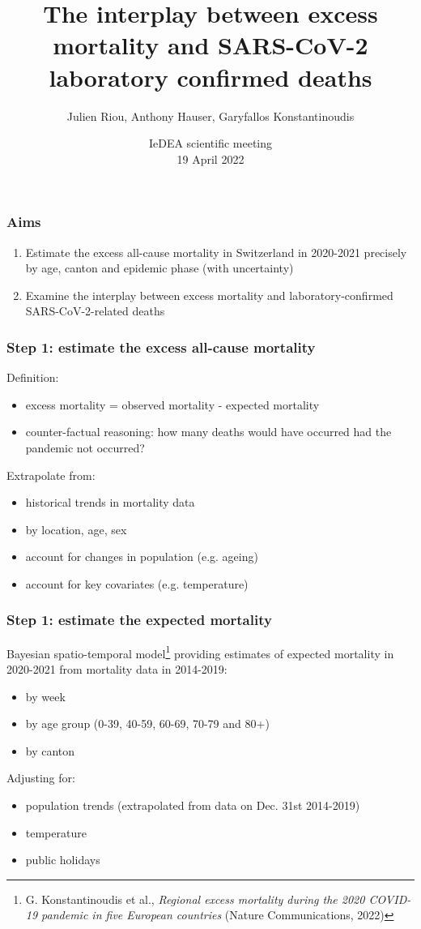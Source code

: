 \documentclass[10pt]{beamer}
\title{The interplay between excess mortality and SARS-CoV-2 laboratory confirmed deaths}
\author{Julien Riou, Anthony Hauser, Garyfallos Konstantinoudis}
\date{ IeDEA scientific meeting \\ 19 April 2022 }
\begin{document}
\frame{\titlepage}

\begin{frame}
\frametitle{Aims}
\begin{enumerate}
	\item Estimate the \alert{excess all-cause mortality} in Switzerland in 2020-2021 precisely by age, canton and epidemic phase (with uncertainty)
	\bigskip
	
	\item Examine the interplay between excess mortality and \alert{laboratory-confirmed SARS-CoV-2-related deaths}

\end{enumerate}
\end{frame}

\begin{frame}
\frametitle{Step 1: estimate the excess all-cause mortality}
Definition: 
\begin{itemize}
 \item excess mortality = observed mortality - expected mortality
 \item counter-factual reasoning: how many deaths would have occurred \alert{had the pandemic not occurred?}
\end{itemize}

\bigskip
Extrapolate from:
\begin{itemize}
	\item historical trends in mortality data 
	\item by location, age, sex
	\item account for changes in population (e.g. ageing)
	\item account for key covariates (e.g. temperature)
\end{itemize}
\end{frame}

\begin{frame}
\frametitle{Step 1: estimate the expected mortality}
\alert{Bayesian spatio-temporal model}\footnote[frame]{ G. Konstantinoudis et al., \textit{Regional excess mortality during the 2020 COVID-19 pandemic in five European countries} (Nature Communications, 2022)}  providing estimates of expected mortality in 2020-2021 from mortality data in 2014-2019:
\begin{itemize}
	\item by week
	\item by age group (0-39, 40-59, 60-69, 70-79 and 80+)
	\item by canton
\end{itemize}
\bigskip

Adjusting for:
\begin{itemize}
	\item population trends (extrapolated from data on Dec. 31st 2014-2019)
	\item temperature
	\item public holidays
\end{itemize}
\end{frame}
\end{document}
